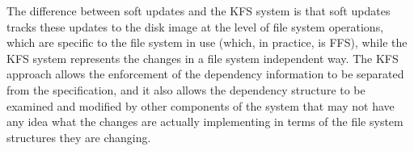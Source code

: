 The difference between soft updates and the KFS system is that soft updates
tracks these updates to the disk image at the level of file system operations,
which are specific to the file system in use (which, in practice, is FFS), while
the KFS system represents the changes in a file system independent way. The KFS
approach allows the enforcement of the dependency information to be separated
from the specification, and it also allows the dependency structure to be
examined and modified by other components of the system that may not have any
idea what the changes are actually implementing in terms of the file system
structures they are changing.
